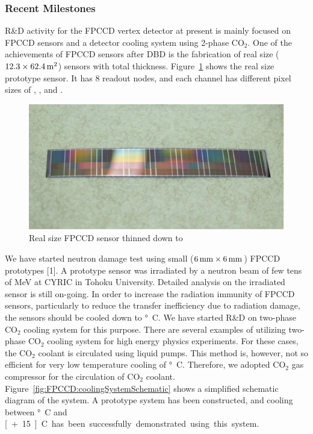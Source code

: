 \subsubsection{Recent Milestones}
R\&D activity for the FPCCD vertex detector at present is mainly focused on FPCCD sensors and a detector cooling system using 2-phase $\text{CO}_2$.  
One of the achievements of FPCCD sensors after DBD is the fabrication of real size ($12.3 \times \unit[62.4]{\mathrm{m}^2}$) sensors with \unit[50]{\micron} total thickness. Figure~\ref{fig:FPCCD:realSizeSensor} shows the real size prototype sensor. It has 8 readout nodes, and each channel has different pixel sizes of \unit[12]{\micron}, \unit[8]{\micron}, and \unit[6]{\micron}.
\begin{figure}
    \includegraphics[width=\textwidth]{VertexDetector/FPCCD/realSizeFPCCDSensor.png}
    \caption{Real size FPCCD sensor thinned down to \unit[50]{\micron}}
    \label{fig:FPCCD:realSizeSensor}
\end{figure}
We have started neutron damage test using small ($\unit[6]{mm}\times\unit[6]{mm}$) FPCCD prototypes [1]. A prototype sensor was irradiated by a neutron beam of few tens of MeV at CYRIC in Tohoku University. Detailed analysis on the irradiated sensor is still on-going. 
In order to increase the radiation immunity of FPCCD sensors, particularly to reduce the transfer inefficiency due to radiation damage, the sensors should be cooled down to \unit[-40]{\degree C}. We have started R\&D on two-phase $\text{CO}_2$ cooling system for this purpose. There are several examples of utilizing two-phase $\text{CO}_2$ cooling system for high energy physics experiments. For these cases, the $\text{CO}_2$ coolant is circulated using liquid pumps. This method is, however, not so efficient for very low temperature cooling of \unit[-40]{\degree C}. Therefore, we adopted $\text{CO}_2$ gas compressor for the circulation of $\text{CO}_2$ coolant. Figure~\ref{fig:FPCCD:coolingSystemSchematic} shows a simplified schematic diagram of the system. A prototype system has been constructed, and cooling between \unit[-40]{\degree C} and \unit[+15]{\degree C} has been successfully demonstrated using this system.
